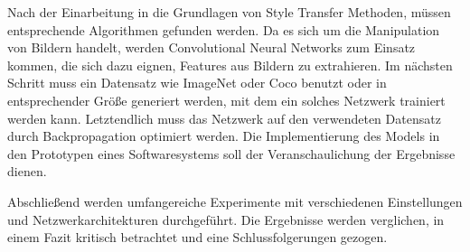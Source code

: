 Nach der Einarbeitung in die Grundlagen von Style Transfer \cite{DBLP:journals/corr/GatysEB15a, DBLP:journals/corr/JohnsonAL16} Methoden, müssen entsprechende Algorithmen gefunden werden. Da es sich um die Manipulation von Bildern handelt, werden Convolutional Neural Networks \cite{lecun-gradientbased-learning-applied-1998} zum Einsatz kommen, die sich dazu eignen, Features aus Bildern zu extrahieren. Im nächsten Schritt muss ein Datensatz wie ImageNet \cite{imagenet_cvpr09} oder Coco \cite{DBLP:journals/corr/LinMBHPRDZ14} benutzt oder in entsprechender Größe generiert werden, mit dem ein solches Netzwerk trainiert werden kann. Letztendlich muss das Netzwerk auf den verwendeten Datensatz durch Backpropagation \cite{doi:10.1162/neco.1989.1.4.541} optimiert werden. Die Implementierung des Models in den Prototypen eines Softwaresystems soll der Veranschaulichung der Ergebnisse dienen.

Abschließend werden umfangereiche Experimente mit verschiedenen Einstellungen und Netzwerkarchitekturen durchgeführt.
Die Ergebnisse werden verglichen, in einem Fazit kritisch betrachtet und eine Schlussfolgerungen gezogen.